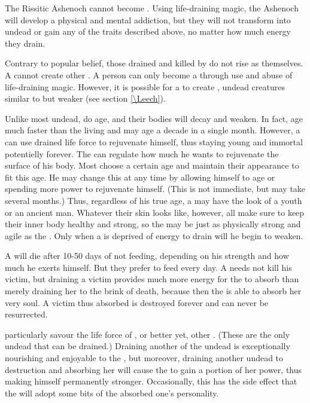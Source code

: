 The Rissitic Ashenoch cannot become \Reavers{}. Using life-draining magic, the Ashenoch will develop a physical and mental addiction, but they will not transform into undead or gain any of the \Reaveric{} traits described above, no matter how much energy they drain. 

Contrary to popular belief, those drained and killed by \Reavers{} do not rise as \Reavers{} themselves. A \Reaver{} cannot create other \Reavers{}. A person can only become a \Reaver{} through use and abuse of life-draining magic. However, it is possible for a \Reaver{} to create \Leeches{}, undead creatures similar to \Reavers{} but weaker (see section \ref{\Leech}). 

Unlike most undead, \Reavers{} do age, and their bodies will decay and weaken. In fact, \Reavers{} age much faster than the living and may age a decade in a single month. However, a \Reaver{} can use drained life force to rejuvenate himself, thus staying young and immortal potentielly forever. The \Reaver{} can regulate how much he wants to rejuvenate the surface of his body. Most \Reavers{} choose a certain age and maintain their appearance to fit this age. He may change this at any time by allowing himself to age or spending more power to rejuvenate himself. (This is not immediate, but may take several months.) Thus, regardless of his true age, a \Reaver{} may have the look of a youth or an ancient man. Whatever their skin looks like, however, all \Reavers{} make sure to keep their inner body healthy and strong, so the  \Reaver{} may be just as physically strong and agile as the  \Reaver{}. Only when a \Reaver{} is deprived of energy to drain will he begin to weaken. 

A \Reaver{} will die after 10-50 days of not feeding, depending on his strength and how much he exerts himself. But they prefer to feed every day. A \Reaver{} needs not kill his victim, but draining a victim provides much more energy for the \Reaver{} to absorb than merely draining her to the brink of death, because then the \Reaver{} is able to absorb her very soul. A victim thus absorbed is destroyed forever and can never be resurrected. 

\Reavers{} particularly savour the life force of \Leeches{}, or better yet, other \Reavers{}. (These are the only undead that can be drained.) Draining another of the undead is exceptionally nourishing and enjoyable to the \Reaver, but moreover, draining another undead to destruction and absorbing her will cause the \Reaver{} to gain a portion of her power, thus making himself permanently stronger. Occasionally, this has the side effect that the \Reaver{} will adopt some bits of the absorbed one's personality. 

